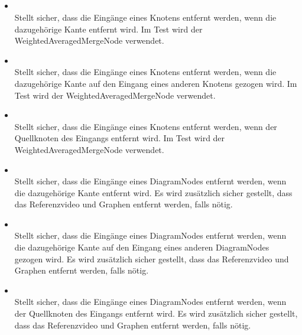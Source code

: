 \subsection{}

\paragraph{}
\begin{itemize}
	\item {} \\
	Stellt sicher, dass die Eingänge eines Knotens entfernt werden, wenn die dazugehörige Kante entfernt wird. Im Test wird der WeightedAveragedMergeNode verwendet.
	\item {} \\
	Stellt sicher, dass die Eingänge eines Knotens entfernt werden, wenn die dazugehörige Kante auf den Eingang eines anderen Knotens gezogen wird. Im Test wird der WeightedAveragedMergeNode verwendet.
	\item {} \\
	Stellt sicher, dass die Eingänge eines Knotens entfernt werden, wenn der Quellknoten des Eingangs entfernt wird. Im Test wird der WeightedAveragedMergeNode verwendet.
	\item {} \\
	Stellt sicher, dass die Eingänge eines DiagramNodes entfernt werden, wenn die dazugehörige Kante entfernt wird. Es wird zusätzlich sicher gestellt, dass das Referenzvideo und Graphen entfernt werden, falls nötig.
	\item {} \\
	Stellt sicher, dass die Eingänge eines DiagramNodes entfernt werden, wenn die dazugehörige Kante auf den Eingang eines anderen DiagramNodes gezogen wird. Es wird zusätzlich sicher gestellt, dass das Referenzvideo und Graphen entfernt werden, falls nötig.
	\item {} \\
	Stellt sicher, dass die Eingänge eines DiagramNodes entfernt werden, wenn der Quellknoten des Eingangs entfernt wird. Es wird zusätzlich sicher gestellt, dass das Referenzvideo und Graphen entfernt werden, falls nötig.
\end{itemize}
